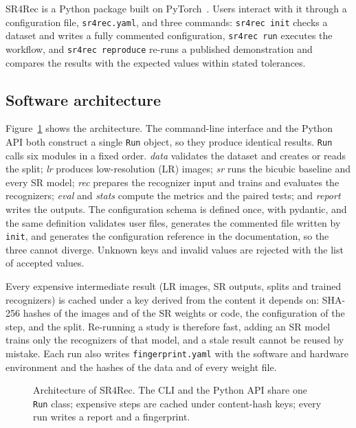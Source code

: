 \documentclass[preprint,12pt]{elsarticle}
\begin{document}
SR4Rec is a Python package built on PyTorch~\cite{paszke2019pytorch}. Users interact with it
through a configuration file, \texttt{sr4rec.yaml}, and three commands: \texttt{sr4rec init} checks a
dataset and writes a fully commented configuration, \texttt{sr4rec run} executes the workflow, and
\texttt{sr4rec reproduce} re-runs a published demonstration and compares the results with the
expected values within stated tolerances.

\subsection{Software architecture}
\label{sec:architecture}

Figure~\ref{fig:architecture} shows the architecture. The command-line interface and the Python API
both construct a single \texttt{Run} object, so they produce identical results. \texttt{Run} calls
six modules in a fixed order. \emph{data} validates the dataset and creates or reads the split;
\emph{lr} produces low-resolution (LR) images; \emph{sr} runs the bicubic baseline and every SR
model; \emph{rec} prepares the recognizer input and trains and evaluates the recognizers;
\emph{eval} and \emph{stats} compute the metrics and the paired tests; and \emph{report} writes the
outputs. The configuration schema is defined once, with pydantic, and the same definition validates
user files, generates the commented file written by \texttt{init}, and generates the configuration
reference in the documentation, so the three cannot diverge. Unknown keys and invalid values are
rejected with the list of accepted values.

Every expensive intermediate result (LR images, SR outputs, splits and trained recognizers) is cached
under a key derived from the content it depends on: SHA-256 hashes of the images and of the SR weights
or code, the configuration of the step, and the split. Re-running a study is therefore fast, adding
an SR model trains only the recognizers of that model, and a stale result cannot be reused by
mistake. Each run also writes \texttt{fingerprint.yaml} with the software and hardware environment
and the hashes of the data and of every weight file.

\begin{figure}[t]
\centering
\resizebox{\linewidth}{!}{}
\caption{Architecture of SR4Rec. The CLI and the Python API share one \texttt{Run} class; expensive
steps are cached under content-hash keys; every run writes a report and a fingerprint.}
\label{fig:architecture}
\end{figure}
\end{document}
